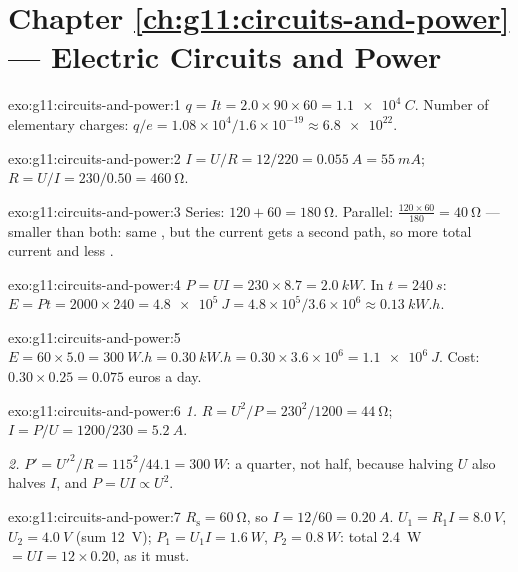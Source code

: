 \section*{Chapter \ref{ch:g11:circuits-and-power} --- Electric Circuits and Power}

\begin{solution}{exo:g11:circuits-and-power:1}
$q = It = 2.0 \times 90 \times 60 = \qty{1.1e4}{C}$. Number of elementary
charges: $q/e = 1.08\times10^{4}/1.6\times10^{-19} \approx \num{6.8e22}$.
\end{solution}

\begin{solution}{exo:g11:circuits-and-power:2}
$I = U/R = 12/220 = \qty{0.055}{A} = \qty{55}{mA}$;
$R = U/I = 230/0.50 = \qty{460}{\ohm}$.
\end{solution}

\begin{solution}{exo:g11:circuits-and-power:3}
Series: $120 + 60 = \qty{180}{\ohm}$. Parallel: $\frac{120 \times 60}{180}
= \qty{40}{\ohm}$ --- smaller than both: same , but the current
gets a second path, so more total current and less .
\end{solution}

\begin{solution}{exo:g11:circuits-and-power:4}
$P = UI = 230 \times 8.7 = \qty{2.0}{kW}$. In $t = \qty{240}{s}$:
$E = Pt = 2000 \times 240 = \qty{4.8e5}{J} = 4.8\times10^{5}/3.6
\times10^{6} \approx \qty{0.13}{kW.h}$.
\end{solution}

\begin{solution}{exo:g11:circuits-and-power:5}
$E = 60 \times 5.0 = \qty{300}{W.h} = \qty{0.30}{kW.h} = 0.30 \times
3.6\times10^{6} = \qty{1.1e6}{J}$. Cost: $0.30 \times 0.25 = 0.075$
euros a day.
\end{solution}

\begin{solution}{exo:g11:circuits-and-power:6}
\emph{1.} $R = U^2/P = 230^2/1200 = \qty{44}{\ohm}$;
$I = P/U = 1200/230 = \qty{5.2}{A}$.

\emph{2.} $P' = U'^2/R = 115^2/44.1 = \qty{300}{W}$: a quarter, not
half, because halving $U$ also halves $I$, and $P = UI \propto U^2$.
\end{solution}

\begin{solution}{exo:g11:circuits-and-power:7}
$R_{\text{s}} = \qty{60}{\ohm}$, so $I = 12/60 = \qty{0.20}{A}$.
$U_1 = R_1 I = \qty{8.0}{V}$, $U_2 = \qty{4.0}{V}$ (sum \qty{12}{V});
$P_1 = U_1 I = \qty{1.6}{W}$, $P_2 = \qty{0.8}{W}$: total \qty{2.4}{W}
$= UI = 12 \times 0.20$, as it must.
\end{solution}

